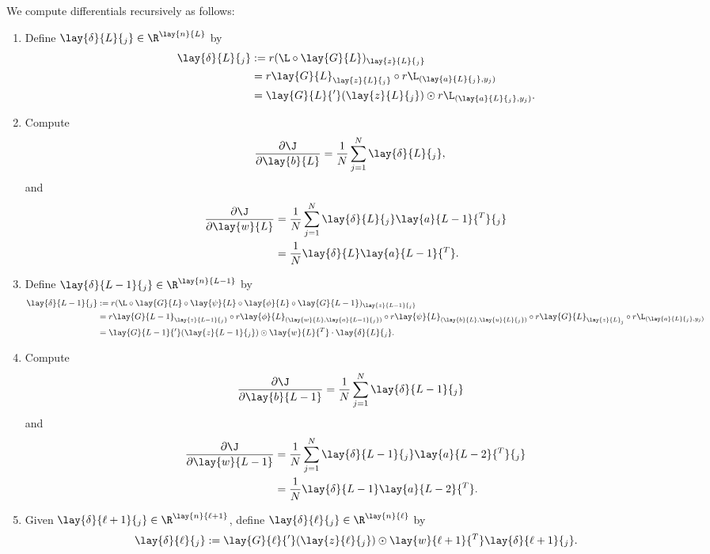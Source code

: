 We compute differentials recursively as follows:
\begin{enumerate}
	\item Define $\lay{\delta}{L}{_j}\in\R^{\lay{n}{L}}$ by
	\begin{align*}
		\lay{\delta}{L}{_j}&:=r(\L\circ\lay{G}{L})_{\lay{z}{L}{_j}}\\
		&=r\lay{G}{L}_{\lay{z}{L}{_j}}\circ r\L_{(\lay{a}{L}{_j},y_j)}\\
		&=\lay{G}{L}{'}(\lay{z}{L}{_j})\odot r\L_{(\lay{a}{L}{_j},y_j)}.
	\end{align*}
	
	\item Compute
	\begin{align*}
		\frac{\partial\J}{\partial\lay{b}{L}}&=\frac{1}{N}\sum_{j=1}^N\lay{\delta}{L}{_j},
	\end{align*}
	and
	\begin{align*}
		\frac{\partial\J}{\partial\lay{w}{L}}&=\frac{1}{N}\sum_{j=1}^N\lay{\delta}{L}{_j}\lay{a}{L-1}{^T}{_j}\\
		&=\frac{1}{N}\lay{\delta}{L}\lay{a}{L-1}{^T}.
	\end{align*}
	
	\item Define $\lay{\delta}{L-1}{_j}\in\R^{\lay{n}{L-1}}$ by
	\begin{align*}
		\lay{\delta}{L-1}{_j}&:=r(\L\circ\lay{G}{L}\circ\lay{\psi}{L}\circ\lay{\phi}{L}\circ\lay{G}{L-1})_{\lay{z}{L-1}{_j}}\\
		&=r\lay{G}{L-1}_{\lay{z}{L-1}{_j}}\circ r\lay{\phi}{L}_{(\lay{w}{L},\lay{a}{L-1}{_j})}\circ r\lay{\psi}{L}_{(\lay{b}{L},\lay{u}{L}{_j})}\circ r\lay{G}{L}_{\lay{z}{L}_j}\circ r\L_{(\lay{a}{L}{_j},y_j)}\\
		&=\lay{G}{L-1}{'}({\lay{z}{L-1}{_j}})\odot\lay{w}{L}{^T}\cdot\lay{\delta}{L}{_j}.
	\end{align*}
	
	\item Compute
	\begin{align*}
		\frac{\partial\J}{\partial\lay{b}{L-1}}&=\frac{1}{N}\sum_{j=1}^N\lay{\delta}{L-1}{_j}
	\end{align*}
	and
	\begin{align*}
		\frac{\partial\J}{\partial\lay{w}{L-1}}&=\frac{1}{N}\sum_{j=1}^N\lay{\delta}{L-1}{_j}\lay{a}{L-2}{^T}{_j}\\
		&=\frac{1}{N}\lay{\delta}{L-1}\lay{a}{L-2}{^T}.
	\end{align*}
	
	\item Given $\lay{\delta}{\ell+1}{_j}\in\R^{\lay{n}{\ell+1}}$, define $\lay{\delta}{\ell}{_j}\in\R^{\lay{n}{\ell}}$ by
	\begin{align*}
		\lay{\delta}{\ell}{_j}:=\lay{G}{\ell}{'}(\lay{z}{\ell}{_j})\odot\lay{w}{\ell+1}{^T}\lay{\delta}{\ell+1}{_j}.
	\end{align*}
	

\end{enumerate}
